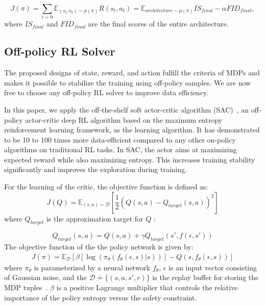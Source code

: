 \documentclass[runningheads]{llncs}
\begin{document}
\begin{equation}
   J(\pi) = \sum_{t=0} \mathbb{E}_{(s_t,a_t)\sim p(\pi)} R(s_t,a_t) =  \mathbb{E}_{architecture\sim p(\pi)} IS_{final} - \alpha FID_{final}, 
\end{equation}
where $IS_{final}$ and $FID_{final}$ are the final scores of the entire architecture.


\subsection{Off-policy RL Solver}
The proposed designs of state, reward, and action fulfill the criteria of MDPs and makes it possible to stabilize the training using off-policy samples. We are now free to choose any off-policy RL solver to improve data efficiency.

In this paper, we apply the off-the-shelf soft actor-critic algorithm (SAC)~\cite{haarnoja2018soft}, an off-policy actor-critic deep RL algorithm based on the maximum entropy reinforcement learning framework, as the learning algorithm. It has demonstrated to be 10 to 100 times more data-efficient compared to any other on-policy algorithms on traditional RL tasks. In SAC, the actor aims at maximizing expected reward while also maximizing entropy. This increases training stability significantly and improves the exploration during training. 

For the learning of the critic, the objective function is defined as:
\begin{equation}
    J(Q) = \mathbb{E}_{(s,a)\sim \mathcal{D}}\left[\frac{1}{2}(Q(s,a)-Q_{target}(s,a))^2\right]
\end{equation}
where $Q_{target}$ is the approximation target for $Q$ :

\begin{equation}
Q_{target}(s,a) = Q(s,a) + \gamma Q_{target}(s', f(\epsilon,s'))
\end{equation}
The objective function of the the policy network is given by:
\begin{equation}
\begin{aligned}
J(\pi) = \mathbb{E}_{ \mathcal{D}}\left[ \beta [\log(\pi_\theta(f_\theta(\epsilon,s)|s))]-Q(s,f_\theta(\epsilon,s)) \right]
\label{SAC}
\end{aligned}
\end{equation}
where $\pi_\theta$ is parameterized by a neural network $f_\theta$, $\epsilon$ is an input vector consisting of Gaussian noise, and the $\mathcal{D}\doteq\{(s,a,s',r)\}$ is the replay buffer  for storing the MDP tuples~\cite{mnih2015human}. $\beta$ is a positive Lagrange multiplier that controls the relative importance of the policy entropy versus the safety constraint. 
\end{document}
